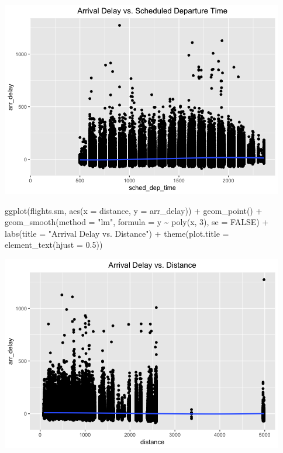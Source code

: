 \documentclass[
]{article}
\newenvironment{Shaded}{\begin{snugshade}}{\end{snugshade}}
\newcommand{\AttributeTok}[1]{\textcolor[rgb]{0.77,0.63,0.00}{#1}}
\newcommand{\ConstantTok}[1]{\textcolor[rgb]{0.00,0.00,0.00}{#1}}
\newcommand{\DecValTok}[1]{\textcolor[rgb]{0.00,0.00,0.81}{#1}}
\newcommand{\FloatTok}[1]{\textcolor[rgb]{0.00,0.00,0.81}{#1}}
\newcommand{\FunctionTok}[1]{\textcolor[rgb]{0.00,0.00,0.00}{#1}}
\newcommand{\NormalTok}[1]{#1}
\newcommand{\SpecialCharTok}[1]{\textcolor[rgb]{0.00,0.00,0.00}{#1}}
\newcommand{\StringTok}[1]{\textcolor[rgb]{0.31,0.60,0.02}{#1}}
\begin{document}
\includegraphics{HW4-Trinath-Sai-Subhash-Reddy-Pittala_files/figure-latex/unnamed-chunk-2-2.png}

\begin{Shaded}
\begin{Highlighting}[]
\FunctionTok{ggplot}\NormalTok{(flights.sm, }\FunctionTok{aes}\NormalTok{(}\AttributeTok{x =}\NormalTok{ distance, }\AttributeTok{y =}\NormalTok{ arr\_delay)) }\SpecialCharTok{+} \FunctionTok{geom\_point}\NormalTok{() }\SpecialCharTok{+}
    \FunctionTok{geom\_smooth}\NormalTok{(}\AttributeTok{method =} \StringTok{"lm"}\NormalTok{, }\AttributeTok{formula =}\NormalTok{ y }\SpecialCharTok{\textasciitilde{}} \FunctionTok{poly}\NormalTok{(x, }\DecValTok{3}\NormalTok{), }\AttributeTok{se =} \ConstantTok{FALSE}\NormalTok{) }\SpecialCharTok{+}
    \FunctionTok{labs}\NormalTok{(}\AttributeTok{title =} \StringTok{"Arrival Delay vs. Distance"}\NormalTok{) }\SpecialCharTok{+} \FunctionTok{theme}\NormalTok{(}\AttributeTok{plot.title =} \FunctionTok{element\_text}\NormalTok{(}\AttributeTok{hjust =} \FloatTok{0.5}\NormalTok{))}
\end{Highlighting}
\end{Shaded}

\includegraphics{HW4-Trinath-Sai-Subhash-Reddy-Pittala_files/figure-latex/unnamed-chunk-2-3.png}
\end{document}
